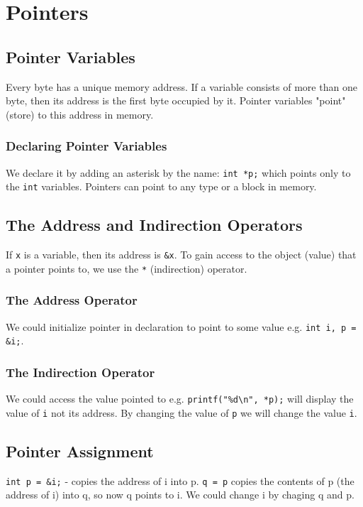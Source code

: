 \documentclass[openany]{book}
\begin{document}
    \chapter{Pointers}

    \section{Pointer Variables}
    Every byte has a unique memory address. If a variable consists of more than one byte, then its address is the first byte occupied by it. Pointer variables "point" (store) to this address in memory.

    \subsection*{Declaring Pointer Variables}
    We declare it by adding an asterisk by the name: \texttt{int *p;} which points only to the \texttt{int} variables. Pointers can point to any type or a block in memory.

    \section{The Address and Indirection Operators}
    If \texttt{x} is a variable, then its address is \texttt{\&x}. To gain access to the object (value) that a pointer points to, we use the \texttt{*} (indirection) operator.

    \subsection*{The Address Operator}
    We could initialize pointer in declaration to point to some value e.g. \texttt{int i, p = \&i;}.

    \subsection*{The Indirection Operator}
    We could access the value pointed to e.g. \texttt{printf("\%d\textbackslash n", *p);} will display the value of \texttt{i} not its address. By changing the value of \texttt{p} we will change the value \texttt{i}.

    \section{Pointer Assignment}
    \texttt{int p = \&i;} - copies the address of i into p. \texttt{q = p} copies the contents of p (the address of i) into q, so now q points to i. We could change i by chaging q and p.
\end{document}
